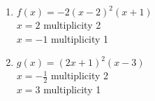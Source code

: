 \documentclass{ximera}
\begin{document}
\begin{enumerate}
\setcounter{enumi}{\value{HW}}

\item $f(x) = -2(x-2)^2(x+1)$\\
$x=2$ multiplicity 2 \\
$x=-1$ multiplicity 1\\

%



\item $g(x) = (2x+1)^2(x-3)$\\
$x=-\frac{1}{2}$ multiplicity 2 \\
$x=3$ multiplicity 1\\

%



\setcounter{HW}{\value{enumi}}
\end{enumerate}

\pagebreak
\end{document}
